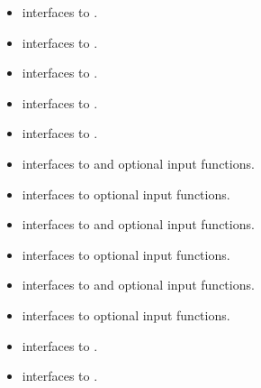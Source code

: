 \begin{itemize}
\begin{itemize}
  \item {}
    interfaces to .
  \item {}
    interfaces to .
  \item {}
    interfaces to .
  \item {}
    interfaces to .
  \item {}
    interfaces to .
  \item {}
    interfaces to  and {\spgmr} optional input functions.
  \item {} 
    interfaces to {\spgmr} optional input functions.
  \item {}
    interfaces to  and {\spbcg} optional input functions.
  \item {} 
    interfaces to {\spbcg} optional input functions.
  \item {}
    interfaces to  and {\sptfqmr} optional input functions.
  \item {} 
    interfaces to {\sptfqmr} optional input functions.
  \item {}
    interfaces to .
  \item {}
    interfaces to .
 \end{itemize}

\end{itemize}

